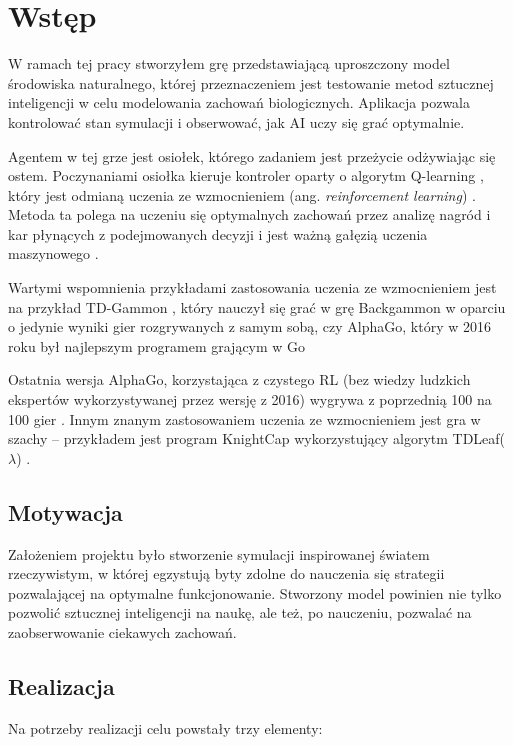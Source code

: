 \chapter{Wstęp}
W ramach tej pracy stworzyłem grę przedstawiającą uproszczony model środowiska naturalnego, której przeznaczeniem jest testowanie metod sztucznej inteligencji w celu modelowania zachowań biologicznych. Aplikacja pozwala kontrolować stan symulacji i obserwować, jak AI uczy się grać optymalnie.

Agentem w tej grze jest osiołek, którego zadaniem jest przeżycie odżywiając się ostem. Poczynaniami osiołka kieruje kontroler oparty o algorytm Q-learning \cite{wiki:Qlearning}, który jest odmianą uczenia ze wzmocnieniem (ang. \textit{reinforcement learning}) \cite{Sutton1998Introduction}. Metoda ta polega na uczeniu się optymalnych zachowań przez analizę nagród i kar płynących z podejmowanych decyzji i jest ważną gałęzią uczenia maszynowego \cite{Sutton1988Learning}.  

Wartymi wspomnienia przykładami zastosowania uczenia ze wzmocnieniem jest na przykład TD-Gammon \cite{Tesauro1994TDGammon}, który nauczył się grać w grę Backgammon w oparciu o jedynie wyniki gier rozgrywanych z samym sobą, czy AlphaGo, który w 2016 roku był najlepszym programem grającym w Go \cite{Silver2016Mastering}

Ostatnia wersja AlphaGo, korzystająca z czystego RL (bez wiedzy ludzkich ekspertów wykorzystywanej przez wersję z 2016) wygrywa z poprzednią 100 na 100 gier \cite{silver2017mastering}. Innym znanym zastosowaniem uczenia ze wzmocnieniem jest gra w szachy -- przykładem jest program KnightCap wykorzystujący algorytm TDLeaf($\lambda$) \cite{Baxter2000Learning}.


\section{Motywacja}
Założeniem projektu było stworzenie symulacji inspirowanej światem rzeczywistym, w której egzystują byty zdolne do nauczenia się strategii pozwalającej na optymalne funkcjonowanie. Stworzony model powinien nie tylko pozwolić sztucznej inteligencji na naukę, ale też, po nauczeniu, pozwalać na zaobserwowanie ciekawych zachowań.


\section{Realizacja}
Na potrzeby realizacji celu powstały trzy elementy:

